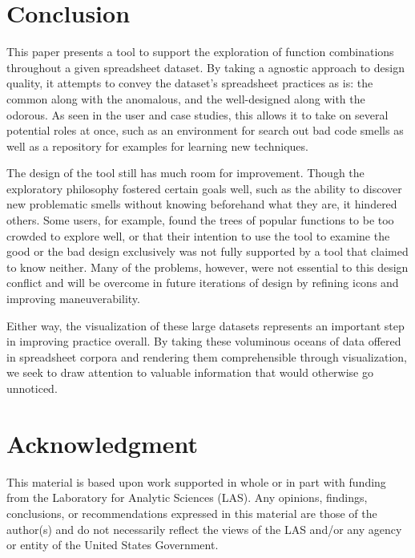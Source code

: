 \documentclass[conference]{IEEEtran}
\begin{document}
	
	
	
	\section{Conclusion} This paper presents a tool to support the exploration of
	function combinations throughout a given spreadsheet dataset. By taking a
	agnostic approach to design quality, it attempts to convey the dataset's
	spreadsheet practices as is: the common along with the anomalous, and the
	well-designed along with the odorous. As seen in the user and case studies,
	this allows it to take on several potential roles at once, such as an
	environment for search out bad code smells as well as a repository for examples
	for learning new techniques. \par
	
	The design of the tool still has much room for improvement. Though the
	exploratory philosophy fostered certain goals well, such as the ability to
	discover new problematic smells without knowing beforehand what they are, it
	hindered others. Some users, for example, found the trees of popular functions
	to be too crowded to explore well, or that their intention to use the tool to
	examine the good or the bad design exclusively was not fully supported by a
	tool that claimed to know neither. Many of the problems, however, were not
	essential to this design conflict and will be overcome in future iterations of
	design by refining icons and improving maneuverability. \par
	
	Either way, the visualization of these large datasets represents an important
	step in improving practice overall. By taking these voluminous oceans of data
	offered in spreadsheet corpora and rendering them comprehensible through
	visualization, we seek to draw attention to valuable information that would otherwise
	go unnoticed.
	
	\section*{Acknowledgment} This material is based upon work supported in whole
	or in part with funding from the Laboratory for Analytic Sciences (LAS). Any
	opinions, findings, conclusions, or recommendations expressed in this material
	are those of the author(s) and do not necessarily reflect the views of the LAS
	and/or any agency or entity of the United States Government.
	
\end{document}
